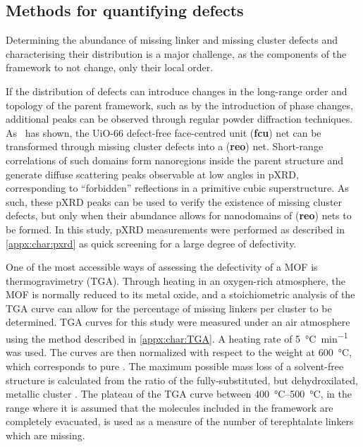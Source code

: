 \subsection{Methods for quantifying defects}

Determining the abundance of missing linker and missing cluster 
defects and characterising their distribution is a major challenge,
as the components of the framework to not change, only their local
order.

If the distribution of defects can introduce changes in the
long-range order and topology of the parent framework,
such as by the introduction of phase changes,
additional peaks can be observed through regular
powder diffraction techniques.
As~\citet{cliffeCorrelatedDefectNanoregions2014} has shown,
the UiO-66 defect-free face-centred unit (\textbf{fcu})
net can be transformed through missing cluster defects into
a (\textbf{reo}) net. Short-range correlations of such domains
form nanoregions inside the parent structure and generate
diffuse scattering peaks observable at low angles in
\gls{pXRD}, corresponding to ``forbidden''
reflections in a primitive cubic superstructure.
As such, these \gls{pXRD} peaks can be used to verify the existence of
missing cluster defects, but only when their abundance allows for
nanodomains of (\textbf{reo}) nets to be formed. In this study,
\gls{pXRD} measurements were performed as described in \autoref{appx:char:pxrd}
as quick screening for a large degree of defectivity.

One of the most accessible ways of assessing the defectivity of
a \gls{MOF} is thermogravimetry (\gls{TGA}). Through heating in
an oxygen-rich atmosphere, the \gls{MOF} is normally reduced to
its metal oxide, and a stoichiometric analysis of the \gls{TGA} curve
can allow for the percentage of missing linkers per cluster to be
determined. \gls{TGA} curves for this study were measured under
an air atmosphere using the method described in \autoref{appx:char:TGA}.
A heating rate of \SI{5}{\degreeCelsius\per\minute} was used.
The curves are then normalized with respect to the weight at
\SI{600}{\degreeCelsius}, which corresponds to pure
. The maximum possible mass loss of a solvent-free
structure is calculated from the ratio of the fully-substituted,
but dehydroxilated, metallic cluster . The plateau
of the \gls{TGA} curve between \SIrange{400}{500}{\degreeCelsius},
in the range where it is assumed that the molecules included in
the framework are completely evacuated, is used as a measure of the
number of terephtalate linkers which are missing.

